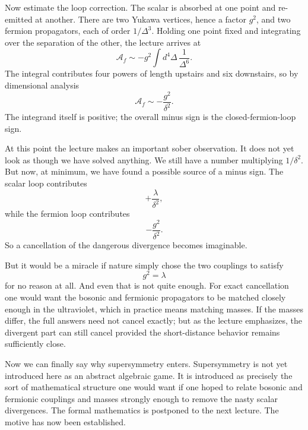 Now estimate the loop correction. The scalar is absorbed at one point and re-emitted at another. There are two Yukawa vertices, hence a factor \(g^2\), and two fermion propagators, each of order \(1/\Delta^3\). Holding one point fixed and integrating over the separation of the other, the lecture arrives at
\begin{equation}
\mathcal{A}_f \sim -g^2 \int d^4\Delta\, \frac{1}{\Delta^6}.
\end{equation}
The integral contributes four powers of length upstairs and six downstairs, so by dimensional analysis
\begin{equation}
\mathcal{A}_f \sim -\frac{g^2}{\delta^2}.
\end{equation}
The integrand itself is positive; the overall minus sign is the closed-fermion-loop sign.

At this point the lecture makes an important sober observation. It does not yet look as though we have solved anything. We still have a number multiplying \(1/\delta^2\). But now, at minimum, we have found a possible source of a minus sign. The scalar loop contributes
\begin{equation}
+\frac{\lambda}{\delta^2},
\end{equation}
while the fermion loop contributes
\begin{equation}
-\frac{g^2}{\delta^2}.
\end{equation}
So a cancellation of the dangerous divergence becomes imaginable.

But it would be a miracle if nature simply chose the two couplings to satisfy
\begin{equation}
g^2=\lambda
\end{equation}
for no reason at all. And even that is not quite enough. For exact cancellation one would want the bosonic and fermionic propagators to be matched closely enough in the ultraviolet, which in practice means matching masses. If the masses differ, the full answers need not cancel exactly; but as the lecture emphasizes, the divergent part can still cancel provided the short-distance behavior remains sufficiently close.

Now we can finally say why supersymmetry enters. Supersymmetry is not yet introduced here as an abstract algebraic game. It is introduced as precisely the sort of mathematical structure one would want if one hoped to relate bosonic and fermionic couplings and masses strongly enough to remove the nasty scalar divergences. The formal mathematics is postponed to the next lecture. The motive has now been established.

